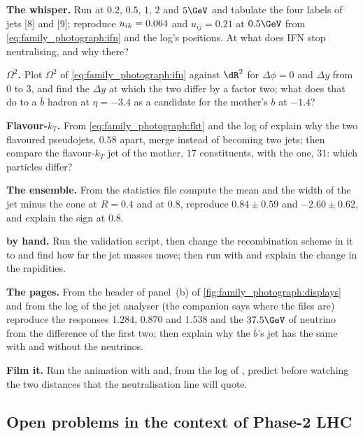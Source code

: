 \begin{exercises}
\item \textbf{The whisper.} Run  at $0.2$, $0.5$, $1$,
  $2$ and $5\GeV$ and tabulate the four labels of jets [8] and [9];
  reproduce $u_{ik}=0.064$ and $u_{ij}=0.21$ at $0.5\GeV$ from
  \cref{eq:family_photograph:ifn} and the log's positions. At what \pt
  does IFN stop neutralising, and why there?
\item \textbf{$\Omega^2$.} Plot $\Omega^2$ of \cref{eq:family_photograph:ifn}
  against $\dR^2$ for $\Delta\phi=0$ and $\Delta y$ from $0$ to $3$, and
  find the $\Delta y$ at which the two differ by a factor two; what does
  that do to a $\bar b$ hadron at $\eta=-3.4$ as a candidate for the
  mother's $b$ at $-1.4$?
\item \textbf{Flavour-$k_T$.} From \cref{eq:family_photograph:fkt} and the log
  of  explain why the two flavoured pseudojets,
  $0.58$ apart, merge instead of becoming two jets; then
  compare the flavour-$k_T$ jet of the mother, $17$ constituents, with
  the \antikt one, $31$: which particles differ?
\item \textbf{The ensemble.} From the statistics file compute the mean
  and the width of the jet minus the cone at $R=0.4$ and at $0.8$,
  reproduce $0.84\pm0.59$ and $-2.60\pm0.62$, and explain the sign at
  $0.8$.
\item \textbf{\FASTJET by hand.} Run the validation script, then change
  the recombination scheme in it to  and find how far
  the jet masses move; then run  with 
  and explain the change in the rapidities.
\item \textbf{The \CMSSW pages.} From the header of panel~(b) of
  \cref{fig:family_photograph:displays} and from the log of the jet
  analyser (the companion says where the files are)
  reproduce the responses $1.284$, $0.870$ and $1.538$ and the $37.5\GeV$
  of neutrino from the difference of the first two; then explain why the
  $\bar b$'s jet has the same \pt with and without the neutrinos.
\item \textbf{Film it.} Run the animation with 
  and, from the  log of , predict before
  watching the two distances that the neutralisation line will quote.
\end{exercises}

\subsection*{Open problems in the context of Phase-2 LHC}
\label{sec:family_photograph:open_problems}

